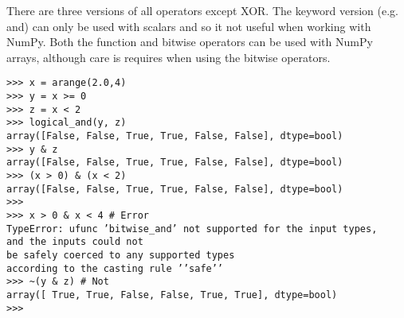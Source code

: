 \documentclass[KSmain.tex]{subfiles}
\begin{document}
\bigskip
\noindent There are three versions of all operators except XOR. The keyword version (e.g. and) can only be used
with scalars and so it not useful when working with NumPy. Both the function and bitwise operators
can be used with NumPy arrays, although care is requires when using the bitwise operators.
\begin{framed}
\begin{verbatim}
>>> x = arange(2.0,4)
>>> y = x >= 0
>>> z = x < 2
>>> logical_and(y, z)
array([False, False, True, True, False, False], dtype=bool)
>>> y & z
array([False, False, True, True, False, False], dtype=bool)
>>> (x > 0) & (x < 2)
array([False, False, True, True, False, False], dtype=bool)
>>>
>>> x > 0 & x < 4 # Error
TypeError: ufunc ’bitwise_and’ not supported for the input types, 
and the inputs could not
be safely coerced to any supported types 
according to the casting rule ’’safe’’
>>> ~(y & z) # Not
array([ True, True, False, False, True, True], dtype=bool)
>>>
\end{verbatim}
\end{framed}
\newpage
\end{document}
